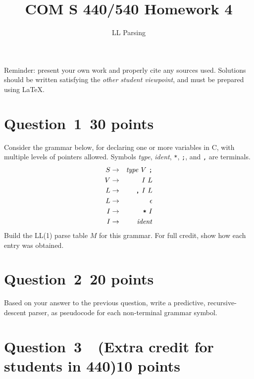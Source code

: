 \documentclass[10pt]{article}
\title{COM S 440/540 Homework 4}
\date{}
\author{LL Parsing}
\renewcommand{\thepage}{~}
\begin{document}
\maketitle

\noindent
Reminder: present your own work and properly cite any sources used.
Solutions should be written satisfying the \emph{other student viewpoint},
and must be prepared using \LaTeX.
\renewcommand{\thepage}{~}
\section*{Question~1~\hfill 30 points}

Consider the grammar below,
for declaring one or more variables in C,
with multiple levels of pointers allowed.
Symbols \emph{type}, \emph{ident}, \verb|*|, \verb|;|, and \verb|,|
are terminals.
\begin{eqnarray}
	S & \rightarrow & \mathit{type} ~ V ~ \verb|;|
\\
	V & \rightarrow & I ~ L
\\
	L & \rightarrow & \verb|,| ~ I ~ L
\\
	L & \rightarrow & \epsilon
\\
	I & \rightarrow & \verb|*| ~ I
\\
	I & \rightarrow & \mathit{ident}
\end{eqnarray}
Build the LL(1) parse table $M$ for this grammar.
For full credit, show how each entry was obtained.

\section*{Question~2~\hfill 20 points}

Based on your answer to the previous question, 
write a predictive, recursive-descent parser,
as pseudocode for each non-terminal grammar symbol.


\section*{Question~3~~(Extra credit for students in 440)\hfill 10 points}
\end{document}
